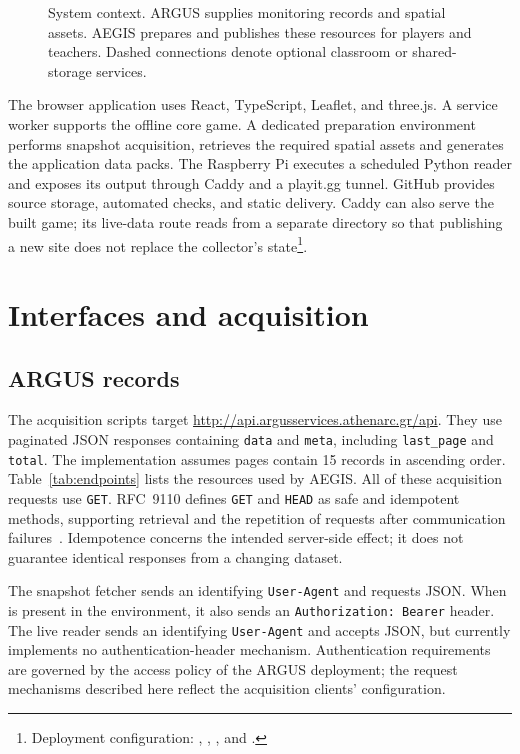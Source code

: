 \documentclass[10pt,a4paper]{article}
\begin{document}
\begin{figure}[htbp]
\centering

\caption{System context. ARGUS supplies monitoring records and spatial assets. AEGIS prepares and publishes these resources for players and teachers. Dashed connections denote optional classroom or shared-storage services.}
\label{fig:context}
\end{figure}

The browser application uses React, TypeScript, Leaflet, and three.js. A service worker supports the offline core game. A dedicated preparation environment performs snapshot acquisition, retrieves the required spatial assets and generates the application data packs. The Raspberry Pi executes a scheduled Python reader and exposes its output through Caddy and a playit.gg tunnel. GitHub provides source storage, automated checks, and static delivery. Caddy can also serve the built game; its live-data route reads from a separate directory so that publishing a new site does not replace the collector's state\footnote{Deployment configuration: , , , and .}.

\section{Interfaces and acquisition}
\subsection{ARGUS records}
The acquisition scripts target \url{http://api.argusservices.athenarc.gr/api}. They use paginated JSON responses containing \texttt{data} and \texttt{meta}, including \texttt{last\_page} and \texttt{total}. The implementation assumes pages contain 15 records in ascending order. Table~\ref{tab:endpoints} lists the resources used by AEGIS. All of these acquisition requests use \texttt{GET}. RFC~9110 defines \texttt{GET} and \texttt{HEAD} as safe and idempotent methods, supporting retrieval and the repetition of requests after communication failures~\cite{http2022}. Idempotence concerns the intended server-side effect; it does not guarantee identical responses from a changing dataset.

The snapshot fetcher sends an identifying \texttt{User-Agent} and requests JSON. When  is present in the environment, it also sends an \texttt{Authorization: Bearer} header. The live reader sends an identifying \texttt{User-Agent} and accepts JSON, but currently implements no authentication-header mechanism. Authentication requirements are governed by the access policy of the ARGUS deployment; the request mechanisms described here reflect the acquisition clients' configuration.
\end{document}
